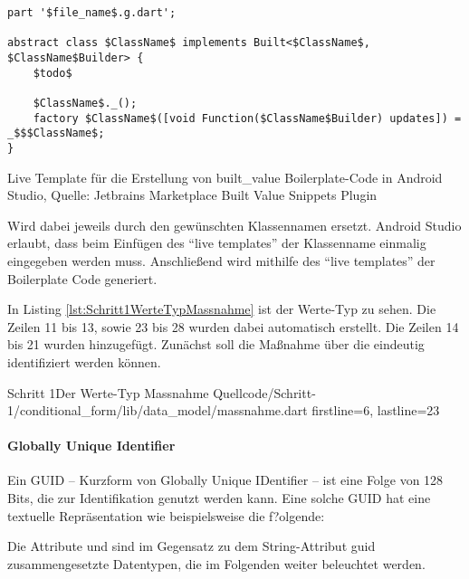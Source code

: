 \ifincludeall
  \begin{listing}[h]
    \begin{verbatim}
part '$file_name$.g.dart';

abstract class $ClassName$ implements Built<$ClassName$, $ClassName$Builder> {
    $todo$
    
    $ClassName$._();
    factory $ClassName$([void Function($ClassName$Builder) updates]) = _$$$ClassName$;
}

\end{verbatim}
    \caption[built_value Live Template]{Live Template für die Erstellung von built_value Boilerplate-Code in Android Studio, Quelle: Jetbrains Marketplace Built Value Snippets Plugin}
    \label{lst:BuiltValueLiveTemplate}
  \end{listing}
\fi

 Wird dabei jeweils durch den gewünschten Klassennamen ersetzt.
Android Studio erlaubt, dass beim Einfügen des \enquote{live templates} der Klassenname einmalig eingegeben werden muss.  Anschließend wird mithilfe des \enquote{live templates} der Boilerplate Code generiert.

In Listing \ref{lst:Schritt1WerteTypMassnahme} ist der Werte-Typ  zu sehen.
Die Zeilen 11 bis 13, sowie 23 bis 28 wurden dabei automatisch erstellt.
Die Zeilen 14 bis 21 wurden hinzugefügt.
Zunächst soll die Maßnahme über die  eindeutig identifiziert werden können.

\begin{alexlisting}{Schritt 1}{Der Werte-Typ Massnahme}
  {Quellcode/Schritt-1/conditional_form/lib/data_model/massnahme.dart}
  {firstline=6, lastline=23}
  \label{lst:Schritt1WerteTypMassnahme}
\end{alexlisting}

\paragraph{Globally Unique Identifier}
Ein GUID – Kurzform von Globally Unique IDentifier – ist  eine Folge von 128 Bits, die zur Identifikation genutzt werden kann.
Eine solche GUID hat eine textuelle Repräsentation wie beispielsweise die f?olgende: 


Die Attribute  und  sind im Gegensatz zu dem String-Attribut guid zusammengesetzte Datentypen, die im Folgenden weiter beleuchtet werden.

